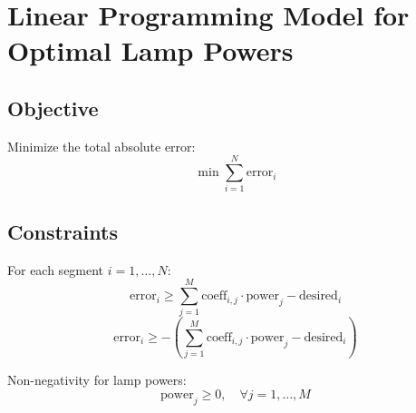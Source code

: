 \documentclass{article}
\begin{document}
\section*{Linear Programming Model for Optimal Lamp Powers}

\subsection*{Objective}
Minimize the total absolute error:
\[
\min \sum_{i=1}^{N} \text{error}_i
\]

\subsection*{Constraints}

For each segment \(i = 1, \ldots, N\):
\[
\text{error}_i \geq \sum_{j=1}^{M} \text{coeff}_{i,j} \cdot \text{power}_j - \text{desired}_i
\]
\[
\text{error}_i \geq -\left(\sum_{j=1}^{M} \text{coeff}_{i,j} \cdot \text{power}_j - \text{desired}_i\right)
\]

Non-negativity for lamp powers:
\[
\text{power}_j \geq 0, \quad \forall j = 1, \ldots, M
\]
\end{document}
